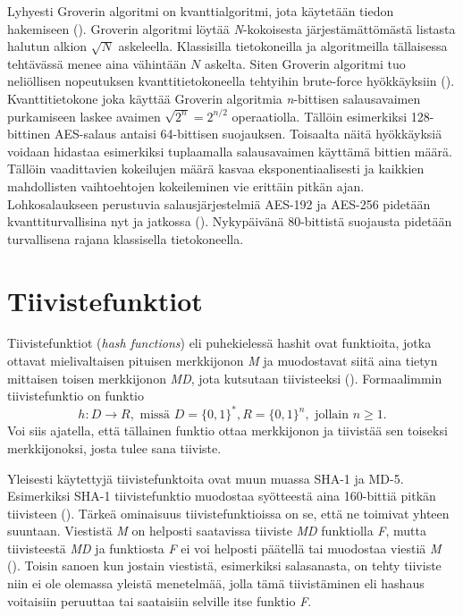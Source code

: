  Lyhyesti Groverin algoritmi on kvanttialgoritmi, jota käytetään tiedon hakemiseen (\cite{hayward2008quantum}). Groverin algoritmi löytää \emph{N}-kokoisesta järjestämättömästä listasta halutun alkion $\sqrt{N}$ askeleella. Klassisilla tietokoneilla ja algoritmeilla tällaisessa tehtävässä menee aina vähintään $N$ askelta. Siten Groverin algoritmi tuo neliöllisen nopeutuksen kvanttitietokoneella tehtyihin brute-force hyökkäyksiin (\cite{mavroeidis2018impact}). Kvanttitietokone joka käyttää Groverin algoritmia \emph{n}-bittisen salausavaimen purkamiseen laskee avaimen $\sqrt{2^{n}} = 2^{n/2}$ operaatiolla. Tällöin esimerkiksi 128-bittinen AES-salaus antaisi 64-bittisen suojauksen. Toisaalta näitä hyökkäyksiä voidaan hidastaa esimerkiksi tuplaamalla salausavaimen käyttämä bittien määrä. Tällöin vaadittavien kokeilujen määrä kasvaa eksponentiaalisesti ja kaikkien mahdollisten vaihtoehtojen kokeileminen vie erittäin pitkän ajan. Lohkosalaukseen perustuvia salausjärjestelmiä AES-192 ja AES-256 pidetään kvanttiturvallisina nyt ja jatkossa (\cite{mavroeidis2018impact}). Nykypäivänä 80-bittistä suojausta pidetään turvallisena rajana klassisella tietokoneella.
 
 \section{Tiivistefunktiot}
 Tiivistefunktiot (\emph{hash functions}) eli puhekielessä hashit  ovat funktioita, jotka ottavat mielivaltaisen pituisen merkkijonon \emph{M} ja muodostavat siitä aina tietyn mittaisen toisen merkkijonon \emph{MD}, jota kutsutaan tiivisteeksi (\cite{sobti2012cryptographic}). Formaalimmin tiivistefunktio on funktio
 \[h: D \to R, \text{ missä } D = \big\{0,1\big\}^{*}, R = \big\{0,1\big\}^{n}, \text{ jollain } n \geq 1.\] Voi siis ajatella, että tällainen funktio ottaa merkkijonon ja tiivistää sen toiseksi merkkijonoksi, josta tulee sana tiiviste.
 
 Yleisesti käytettyjä tiivistefunktoita ovat muun muassa SHA-1 ja MD-5. %
 Esimerkiksi SHA-1 tiivistefunktio muodostaa syötteestä aina 160-bittiä pitkän tiivisteen (\cite{bellare2005introduction}). Tärkeä ominaisuus tiivistefunktioissa on se, että ne toimivat yhteen suuntaan. Viestistä \emph{M} on helposti saatavissa tiiviste \emph{MD} funktiolla \emph{F}, mutta tiivisteestä \emph{MD} ja funktiosta \emph{F} ei voi helposti päätellä tai muodostaa viestiä \emph{M} (\cite{bakhtiari1995cryptographic}). Toisin sanoen kun jostain viestistä, esimerkiksi salasanasta, on tehty tiiviste niin ei ole olemassa yleistä menetelmää, jolla tämä tiivistäminen eli hashaus voitaisiin peruuttaa tai saataisiin selville itse funktio \emph{F}.
 
